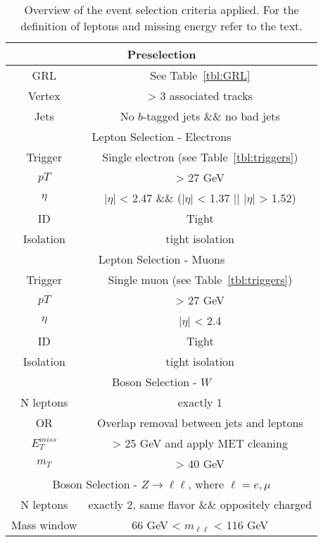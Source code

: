 \begin{table}[htbp]
\begin{center}
 \begin{tabular}{c | c} 
 \hline
 \hline
 \multicolumn{2}{c}{Preselection} \\
 \hline
 GRL & See Table~\ref{tbl:GRL}  \\ 
 Vertex & > 3 associated tracks  \\ 
 Jets & No $b$-tagged jets \&\& no bad jets \\
 \hline
 \multicolumn{2}{c}{Lepton Selection - Electrons} \\
 \hline
Trigger & Single electron (see Table~\ref{tbl:triggers}) \\
 $pT$ & > 27 GeV \\
 $\eta$ & $|\eta|$ < 2.47 \&\& ($|\eta|$ < 1.37 || $|\eta|$ > 1.52) \\
 ID & Tight \\
 Isolation & tight isolation \\
 \hline
 \multicolumn{2}{c}{Lepton Selection - Muons} \\
 \hline
 Trigger & Single muon (see Table~\ref{tbl:triggers}) \\
 $pT$ & > 27 GeV \\
 $\eta$ & $|\eta|$ < 2.4 \\
 ID & Tight \\
 Isolation & tight isolation \\
 \hline
 \multicolumn{2}{c}{Boson Selection - $W$} \\
 \hline
 N leptons & exactly 1 \\
 OR & Overlap removal between jets and leptons \\
 $E_{T}^{miss}$ & > 25 GeV and apply MET cleaning \\
 $m_{T}$ & > 40 GeV \\
 \hline
 \multicolumn{2}{c}{Boson Selection - $Z\rightarrow\ell\ell$, where $\ell=e,\mu$} \\
 \hline
 N leptons & exactly 2, same flavor \&\& oppositely charged \\
 Mass window & 66 GeV < $m_{\ell\ell}$ < 116 GeV  \\
 \hline
 \hline
\end{tabular}
\caption{Overview of the event selection criteria applied. For the definition of leptons and missing energy refer to the text.}%
\label{tbl:event_selection}
\end{center}
\end{table}

